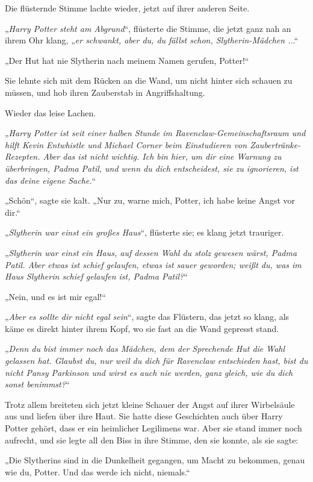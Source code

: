 {Die flüsternde Stimme lachte wieder, jetzt auf ihrer anderen Seite.

„\emph{Harry Potter steht am Abgrund}“, flüsterte die Stimme, die jetzt ganz nah an ihrem Ohr klang, „\emph{er schwankt, aber du, du fällst schon, Slytherin-Mädchen ..}.“

„Der Hut hat nie Slytherin nach meinem Namen gerufen, Potter!“

Sie lehnte sich mit dem Rücken an die Wand, um nicht hinter sich schauen zu müssen, und hob ihren Zauberstab in Angriffshaltung.

Wieder das leise Lachen.

„\emph{Harry Potter ist seit einer halben Stunde im Ravenclaw-Gemeinschaftsraum und hilft Kevin Entwhistle und Michael Corner beim Einstudieren von Zaubertränke-Rezepten. Aber das ist nicht wichtig. Ich bin hier, um dir eine Warnung zu überbringen, Padma Patil, und wenn du dich entscheidest, sie zu ignorieren, ist das deine eigene Sache.}“

„Schön“, sagte sie kalt. „Nur zu, warne mich, Potter, ich habe keine Angst vor dir.“

„\emph{Slytherin war einst ein großes Haus}“, flüsterte sie; es klang jetzt trauriger.

„\emph{Slytherin war einst ein Haus, auf dessen Wahl du stolz gewesen wärst, Padma Patil. Aber etwas ist schief gelaufen, etwas ist sauer geworden; weißt du, was im Haus Slytherin schief gelaufen ist, Padma Patil?}“

„Nein, und es ist mir egal!“

„\emph{Aber es sollte dir nicht egal sein}“, sagte das Flüstern, das jetzt so klang, als käme es direkt hinter ihrem Kopf, wo sie fast an die Wand gepresst stand.

„\emph{Denn du bist immer noch das Mädchen, dem der Sprechende Hut die Wahl gelassen hat. Glaubst du, nur weil du dich für Ravenclaw entschieden hast, bist du nicht Pansy Parkinson und wirst es auch nie werden, ganz gleich, wie du dich sonst benimmst?}“

Trotz allem breiteten sich jetzt kleine Schauer der Angst auf ihrer Wirbelsäule aus und liefen über ihre Haut. Sie hatte diese Geschichten auch über Harry Potter gehört, dass er ein heimlicher Legilimens war. Aber sie stand immer noch aufrecht, und sie legte all den Biss in ihre Stimme, den sie konnte, als sie sagte:

„Die Slytherins sind in die Dunkelheit gegangen, um Macht zu bekommen, genau wie du, Potter. Und das werde ich nicht, niemals.“

}

